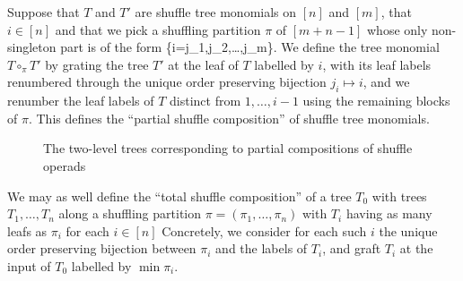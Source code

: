 \documentclass[fleqn, a4paper, twoside]{article}
\makeatletter
\newcommand{\0}{\langle 0\rangle}
\let\[\@undefined
\DeclareRobustCommand{\[}{\begin{equation}}%
\let\]\@undefined
\DeclareRobustCommand{\]}{\end{equation}}%
\theoremstyle{mytheorem}
\theoremstyle{introthm}
\theoremstyle{mydefinition}
\theoremstyle{mydefinition2}
\theoremstyle{plain} %
\newcommand{\?}{\,?\,}
\theoremstyle{mytheorem}
\theoremstyle{plain} %
\makeatother
\begin{document}
Suppose that $T$ and $T'$ are shuffle tree
monomials on $[n]$ and $[m]$, that $i\in [n]$
and that we pick a shuffling partition $\pi$ of
$[m+n-1]$ whose only non-singleton part
is of the form 
\[ \{i=j_1,j_2,\dots,j_m\}.\]
We define the tree monomial $T\circ_\pi T'$
by grating the tree $T'$ at the leaf of $T$
labelled by $i$, with its leaf labels
renumbered through the unique order
preserving bijection $j_i \longmapsto
i$, and we renumber the leaf labels
of $T$ distinct from $1,\ldots,i-1$ using
the remaining blocks of $\pi$. This
defines the ``partial shuffle composition''
of shuffle tree monomials.

\begin{figure}

\caption{The two-level trees corresponding
 to partial compositions of shuffle operads}
 \label{fig:twolevel}
\end{figure}
We may as well define the ``total shuffle
composition'' of a tree $T_0$ with trees
$T_1,\ldots,T_n$ along a shuffling partition
$\pi = (\pi_1,\ldots,\pi_n)$ with $T_i$ having
as many leafs as $\pi_i$ for each $i\in [n]$
Concretely, we consider for each such $i$
the unique order preserving bijection
between $\pi_i$ and the labels of $T_i$,
and graft $T_i$ at the input of $T_0$
labelled by $\min \pi_i$. 
\end{document}
